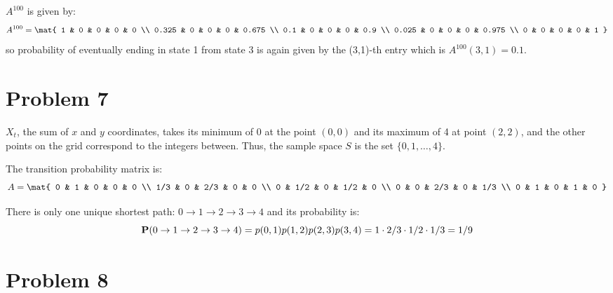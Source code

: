 \documentclass{homework}
\begin{document}
\begin{letterenum}
\item $A^{100}$ is given by:
\begin{equation*}
    A^{100} = \mat{
        1 & 0 & 0 & 0 & 0 \\
        0.325 & 0 & 0 & 0 & 0.675 \\
        0.1 & 0 & 0 & 0 & 0.9 \\
        0.025 & 0 & 0 & 0 & 0.975 \\
        0 & 0 & 0 & 0 & 1
    }
\end{equation*}
so probability of eventually ending in state 1 from state 3 is again given by
the (3,1)-th entry which is $A^{100}(3,1) = 0.1$.
\end{letterenum}

\section{Problem 7}
\begin{letterenum}
\item $X_t$, the sum of $x$ and $y$ coordinates, takes its minimum of 0
at the point $(0, 0)$ and its maximum of 4 at point $(2,2)$, and the
other points on the grid correspond to the integers between. Thus, the sample
space $S$ is the set $\{0, 1, \dots, 4\}$.

\item The transition probability matrix is:
\begin{equation*}
    A = \mat{
        0 & 1 & 0 & 0 & 0 \\
        1/3 & 0 & 2/3 & 0 & 0 \\
        0 & 1/2 & 0 & 1/2 & 0 \\
        0 & 0 & 2/3 & 0 & 1/3 \\
        0 & 1 & 0 & 1 & 0
    }
\end{equation*}

\item There is only one unique shortest path: $0\to1\to2\to3\to4$ and its
probability is: 
\begin{equation*}
    {\bf P}(0\to1\to2\to3\to4) = p(0, 1)p(1,2) p(2,3) p(3,4)
        = 1 \cdot 2/3 \cdot 1/2 \cdot 1/3 = 1/9
\end{equation*}

\end{letterenum}

\section{Problem 8}
\end{document}
